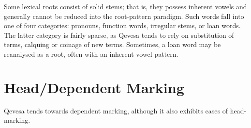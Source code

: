 \documentclass[grammar]{subfiles}
\begin{document}
  Some lexical roots consist of solid stems; that is, they possess inherent vowels and generally cannot be reduced into the root-pattern paradigm.  Such words fall into one of four categories: pronouns, function words, irregular stems, or loan words.  The latter category is fairly sparse, as Qevesa tends to rely on substitution of terms, calquing or coinage of new terms.  Sometimes, a loan word may be reanalysed as a root, often with an inherent vowel pattern.

  \section{Head/Dependent Marking}
  \label{sec:mt_head_dependent_marking}

  Qevesa tends towards dependent marking, although it also exhibits cases of head-marking.

  \ToBeWritten













\end{document}
